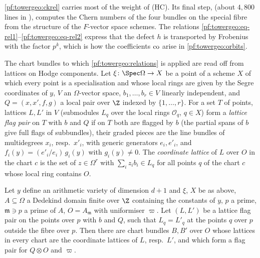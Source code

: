 \begin{remark}\label{pf:towergeo:rem-relations}
\cref{pf:towergeo:ckrel} carries most of the weight of (HC). Its final step,
 (about $4{,}800$ lines in \cite{LeanSource2026}),
computes the Chern numbers of the four bundles on the special fibre from the structure of the $F$-vector space
schemes. The relations
\eqref{pf:towergeo:eq-rel1}--\eqref{pf:towergeo:eq-rel2} express that the defect $h$ is transported by
Frobenius with the factor $p^k$, which is how the coefficients $\operatorname{co}$ arise in
\cref{pf:towergeo:orbits}.
\end{remark}

The chart bundles to which \cref{pf:towergeo:relations} is applied are read off from lattices on Hodge
components. Let $\xi\colon\Spec\Omega\to X$ be a point of a scheme $X$ of which every point is a specialisation and
whose local rings are given by the Segre coordinates of $y$, $V$ an $\Omega$-vector space, $b_1,\dots,b_r\in V$
linearly independent, and $Q=(x,x',f,g)$ a local pair over $\Z$ indexed by $\{1,\dots,r\}$. For a set $T$ of points,
lattices $L,L'$ in $V$ (submodules $L_q$ over the local rings $\mathcal O_q$, $q\in X$) form a \emph{lattice flag
pair} on $T$ with $b$ and $Q$ if on $T$ both are flagged by $b$ (the partial spans of $b$ give full flags of
subbundles), their graded pieces are the line bundles of multidegrees $x_i$, resp.\ $x'_i$, with generic generators
$e_i,e'_i$, and $f_i(y)=(e'_i/e_i)\,g_i(y)$ with $g_i(y)\ne0$. The \emph{coordinate lattice} of $L$ over $O$ in the
chart $c$ is the set of $z\in\Omega^r$ with $\sum_iz_ib_i\in L_q$ for all points $q$ of the chart $c$ whose local
ring contains $O$.

\begin{proposition}\label{pf:towergeo:dedekind}
Let $y$ define an arithmetic variety of dimension $d+1$ and $\xi$, $X$ be as above, $A\subseteq\Omega$ a Dedekind
domain finite over $\Z$ containing the constants of $y$, $p$ a prime, $\mathfrak m\ni p$ a prime of $A$,
$O=A_{\mathfrak m}$ with uniformiser $\varpi$. Let $(L,L')$ be a lattice flag pair on the points over $p$ with $b$
and $Q$, such that $L_q=L'_q$ at the points $q$ over $p$ outside the fibre over $p$. Then there are chart bundles
$B,B'$ over $O$ whose lattices in every chart are the coordinate lattices of $L$, resp.\ $L'$, and which form a
flag pair for $Q\otimes O$ and $\varpi$.
\end{proposition}

